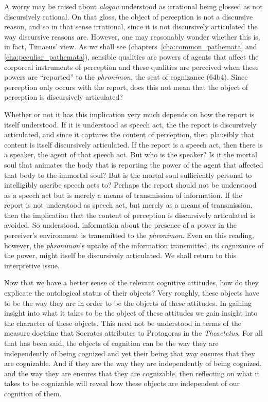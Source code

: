 A worry may be raised about \emph{alogou} understood as irrational being glossed as not discursively rational. On that gloss, the object of perception is not a discursive reason, and so in that sense irrational, since it is not discursively articulated the way discursive reasons are. However, one may reasonably wonder whether this is, in fact, Timaeus' view. As we shall see (chapters~\ref{cha:common_pathemata} and \ref{cha:peculiar_pathemata}), sensible qualities are powers of agents that affect the corporeal instruments of perception and these qualities are perceived when these powers are ``reported'' to the \emph{phronimon}, the seat of cognizance (64b4). Since perception only occurs with the report, does this not mean that the object of perception is discursively articulated?

Whether or not it has this implication very much depends on how the report is itself understood. If it is understood as speech act, the the report is discursively articulated, and since it captures the content of perception, then plausibly that content is itself discursively articulated. If the report is a speech act, then there is a speaker, the agent of that speech act. But who is the speaker? Is it the mortal soul that animates the body that is reporting the power of the agent that affected that body to the immortal soul? But is the mortal soul sufficiently personal to intelligibly ascribe speech acts to? Perhaps the report should not be understood as a speech act but is merely a means of transmission of information. If the report is not understood as speech act, but merely as a means of transmission, then the implication that the content of perception is discursively articulated is avoided. So understood, information about the presence of a power in the perceiver's environment is transmitted to the \emph{phronimon}. Even on this reading, however, the \emph{phronimon}'s uptake of the information transmitted, its cognizance of the power, might itself be discursively articulated. We shall return to this interpretive issue.

Now that we have a better sense of the relevant cognitive attitudes, how do they explicate the ontological status of their objects? Very roughly, these objects have to be the way they are in order to be the objects of these attitudes. In gaining insight into what it takes to be the object of these attitudes we gain insight into the character of these objects. This need not be understood in terms of the measure doctrine that Socrates attributes to Protagoras in the \emph{Theaetetus}. For all that has been said, the objects of cognition can be the way they are independently of being cognized and yet their being that way ensures that they are cognizable. And if they are the way they are independently of being cognized, and the way they are ensures that they are cognizable, then reflecting on what it takes to be cognizable will reveal how these objects are independent of our cognition of them.

